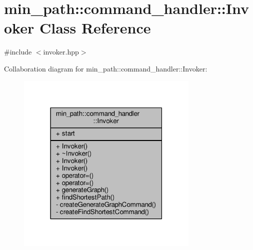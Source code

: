 \hypertarget{a00009}{}\section{min\+\_\+path\+:\+:command\+\_\+handler\+:\+:Invoker Class Reference}
\label{a00009}


{\ttfamily \#include $<$invoker.\+hpp$>$}



Collaboration diagram for min\+\_\+path\+:\+:command\+\_\+handler\+:\+:Invoker\+:
\nopagebreak
\begin{figure}[H]
\begin{center}
\leavevmode
\includegraphics[width=247pt]{d8/d53/a00081}
\end{center}
\end{figure}
